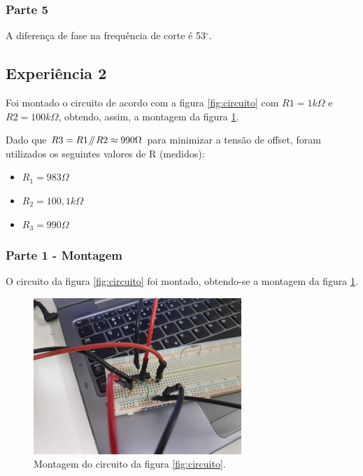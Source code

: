 \documentclass{abntex2}
\newcommand{\parallelsum}{\mathbin{\!/\mkern-5mu/\!}}
\begin{document}
\subsubsection{Parte 5}
A diferença de fase na frequência de corte é 53$^\circ$.


\subsection{Experiência 2}

Foi montado o circuito de acordo com a figura \ref{fig:circuito} com $R1 = 1k\Omega$ e $R2 = 100k\Omega$, obtendo, assim, a montagem da figura \ref{fig:montagem2}.

Dado que $R3 = R1 \parallelsum R2 \approx 990 \Omega$ para minimizar a tensão de offset, foram utilizados os seguintes valores de R (medidos):

\begin{itemize}
  \item $R_1 = 983\Omega$
  \item $R_2 = 100,1k\Omega$
  \item $R_3 = 990\Omega$
\end{itemize}

\subsubsection{Parte 1 - Montagem}

O circuito da figura \ref{fig:circuito} foi montado, obtendo-se a montagem da figura \ref{fig:montagem2}.

\begin{figure}[h]
  \centering
  \includegraphics[width = 0.7\textwidth]{montagem2.jpg}
  \caption{Montagem do circuito da figura \ref{fig:circuito}.}
  \label{fig:montagem2}
\end{figure}
\end{document}
